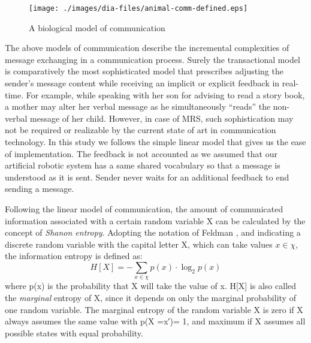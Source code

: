 \begin{figure}
\centering
\texttt{[image: ./images/dia-files/animal-comm-defined.eps]}
\caption{ A biological model of communication }
\label{fig:bio-comm-defined} 
\end{figure}
The above models of communication describe the incremental complexities of message exchanging in a communication process. Surely the transactional model is comparatively the most sophisticated model that prescribes adjusting the sender's message content while receiving an implicit or explicit feedback in real-time. For example, while speaking with her son for advising to read a story book, a mother may alter her verbal message as he simultaneously ``reads'' the non-verbal message of her child. However, in case of MRS, such sophistication may not be required or realizable by the current state of art in communication technology. In this study we follows the simple linear model that gives us the ease of implementation. The feedback is not accounted as we assumed that our artificial robotic system has a same shared vocabulary so that a message is understood as it is sent. Sender never waits for an additional feedback to end sending a message. 

Following the linear model of communication, the amount of communicated information associated with a certain random variable X can be calculated by the concept of {\em Shanon entropy}. Adopting the notation of Feldman \cite{Feldman1997}, and indicating a discrete random variable with the capital letter X, which can take values $x \in \chi$, the information entropy is defined as:
\begin{equation}
\label{eq:entropy}
H[X] = - \sum_{x \in \chi } p(x) \cdot  \log_{2} p(x)
\end{equation}
where p(x) is the probability that X will take the value of x. H[X] is also called the {\em marginal} entropy of X, since it depends on only the marginal probability of one random variable. The marginal entropy of the random variable X is zero if X always assumes the same value with p(X =x′)= 1, and maximum if X assumes all possible states with equal probability.

